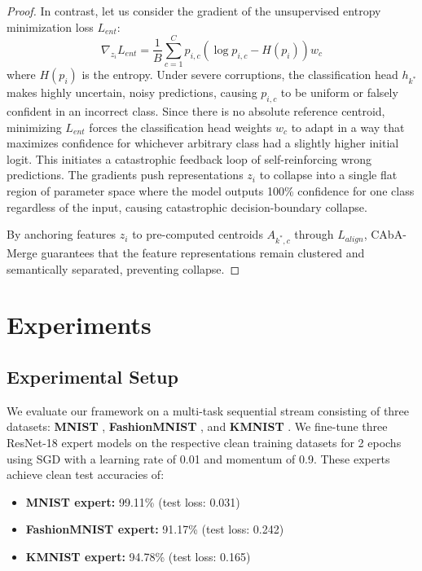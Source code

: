 \documentclass{article}
\theoremstyle{plain}
\theoremstyle{definition}
\theoremstyle{remark}
\begin{document}
\begin{proof}
In contrast, let us consider the gradient of the unsupervised entropy minimization loss $L_{ent}$:
\begin{equation}
    \nabla_{z_i} L_{ent} = \frac{1}{B} \sum_{c=1}^C p_{i, c} \left( \log p_{i, c} - H(p_i) \right) w_c
\end{equation}
where $H(p_i)$ is the entropy. Under severe corruptions, the classification head $h_{k^*}$ makes highly uncertain, noisy predictions, causing $p_{i, c}$ to be uniform or falsely confident in an incorrect class. Since there is no absolute reference centroid, minimizing $L_{ent}$ forces the classification head weights $w_c$ to adapt in a way that maximizes confidence for whichever arbitrary class had a slightly higher initial logit. This initiates a catastrophic feedback loop of self-reinforcing wrong predictions. The gradients push representations $z_i$ to collapse into a single flat region of parameter space where the model outputs 100\% confidence for one class regardless of the input, causing catastrophic decision-boundary collapse. 

By anchoring features $z_i$ to pre-computed centroids $A_{k^*, c}$ through $L_{align}$, CAbA-Merge guarantees that the feature representations remain clustered and semantically separated, preventing collapse.
\end{proof}

\section{Experiments}
\label{sec:experiments}

\subsection{Experimental Setup}
We evaluate our framework on a multi-task sequential stream consisting of three datasets: \textbf{MNIST} \cite{lecun1998gradient}, \textbf{FashionMNIST} \cite{xiao2017fashion}, and \textbf{KMNIST} \cite{clanuwat2018deep}. We fine-tune three ResNet-18 expert models on the respective clean training datasets for 2 epochs using SGD with a learning rate of 0.01 and momentum of 0.9. These experts achieve clean test accuracies of:
\begin{itemize}
    \item \textbf{MNIST expert:} 99.11\% (test loss: 0.031)
    \item \textbf{FashionMNIST expert:} 91.17\% (test loss: 0.242)
    \item \textbf{KMNIST expert:} 94.78\% (test loss: 0.165)
\end{itemize}
\end{document}
